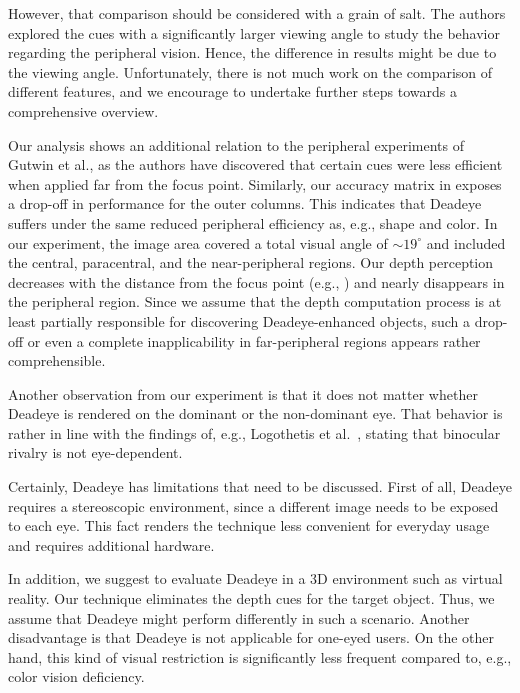 \documentclass[journal]{vgtc}                %
\begin{document}
However, that comparison should be considered with a grain of salt. The authors explored the cues with a significantly larger viewing angle to study the behavior regarding the peripheral vision. Hence, the difference in results might be due to the viewing angle. Unfortunately, there is not much work on the comparison of different features, and we encourage to undertake further steps towards a comprehensive overview.

Our analysis shows an additional relation to the peripheral experiments of Gutwin et al., as the authors have discovered that certain cues were less efficient when applied far from the focus point. Similarly, our accuracy matrix in  exposes a drop-off in performance for the outer columns. This indicates that Deadeye suffers under the same reduced peripheral efficiency as, e.g., shape and color. In our experiment, the image area covered a total visual angle of $\sim19^{\circ}$ and included the central, paracentral, and the near-peripheral regions. Our depth perception decreases with the distance from the focus point (e.g., \cite{mochizuki2012magnitude}) and nearly disappears in the peripheral region. Since we assume that the depth computation process is at least partially responsible for discovering Deadeye-enhanced objects, such a drop-off or even a complete inapplicability in far-peripheral regions appears rather comprehensible.



Another observation from our experiment is that it does not matter whether Deadeye is rendered on the dominant or the non-dominant eye. That behavior is rather in line with the findings of, e.g., Logothetis et al.~\cite{logothetis1996rivalling}, stating that binocular rivalry is not eye-dependent.

Certainly, Deadeye has limitations that need to be discussed. First of all, Deadeye requires a stereoscopic environment, since a different image needs to be exposed to each eye. This fact renders the technique less convenient for everyday usage and requires additional hardware.

In addition, we suggest to evaluate Deadeye in a 3D environment such as virtual reality. Our technique eliminates the depth cues for the target object. Thus, we assume that Deadeye might perform differently in such a scenario. Another disadvantage is that Deadeye is not applicable for one-eyed users. On the other hand, this kind of visual restriction is significantly less frequent compared to, e.g., color vision deficiency.
\end{document}
